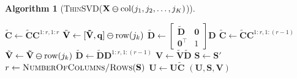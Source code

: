 \documentclass[11pt,a4paper]{article}
\theoremstyle{break}
\newtheorem*{algorithm}{Algorithm}
\numberwithin{dummy}{section}
\theoremstyle{plain}
\theoremstyle{plain}
\theoremstyle{plain}
\theoremstyle{plain}
\theoremstyle{plain}
\theoremstyle{MyNonumberplain}
\newcommand{\0}{\M{0}}
\newcommand{\M}[1]{\mathbf{#1}}
\newcommand{\Mt}[1]{\tilde{\M{#1}}}
\newcommand{\T}{\top}
\newcommand{\ve}[1]{\mathbf{#1}}
\newcommand{\delcol}[2]{\M{#1} \varominus {\mathrm{col}}({#2})}
\newcommand{\delrow}[2]{\M{#1} \varominus \mathrm{row}(#2)}
\begin{document}
\begin{algorithm}[\textnormal{\textsc{ThinSVD}(\unboldmath$\delcol{X}{j_1,j_2, \dots, j_K}$)}]
\begin{algorithmic}[1]
    \If {$\ve{q} \neq \0$}
    \State
    \begin{math}
      \Mt{C}
      \gets
      \Mt{C}  \M{C}^{1:r, 1:r}
    \end{math}
    \State
    \begin{math}
      \Mt{V} \gets \delrow{[\Mt{V}, \ve{q}]}{j_k}
    \end{math}
    \State
    \begin{math}
      \Mt{D}
      \gets
      \begin{bmatrix}
        \Mt{D} & \0
        \\
        \0^\T & 1
      \end{bmatrix}
      \M{D}
    \end{math}
    \Else
    \State
    \begin{math}
      \Mt{C}
      \gets
      \Mt{C}  \M{C}^{1:r, 1:(r-1)}
    \end{math}
    \State
    \begin{math}
      \Mt{V}
      \gets
      \delrow{\Mt{V}}{j_k}
    \end{math}
    \State
    \begin{math}
      \Mt{D}
      \gets
      \Mt{D} \M{D}^{1:r, 1:(r-1)}
    \end{math}
    \EndIf
    \State
    \begin{math}
      \M{V} \gets \Mt{V} \Mt{D}
    \end{math}
    \State
    \begin{math}
      \M{S} \gets \M{S}'
    \end{math}
    \State
    \begin{math}
      r \gets \textsc{NumberOfColumns/Rows}(\M{S})
    \end{math}
    \EndFor
   \State
    \begin{math}
      \M{U} \gets \M{U} \Mt{C}
    \end{math}
    \State
    \Return $(\M{U}, \M{S}, \M{V})$
  \end{algorithmic}
\end{algorithm}
\end{document}
